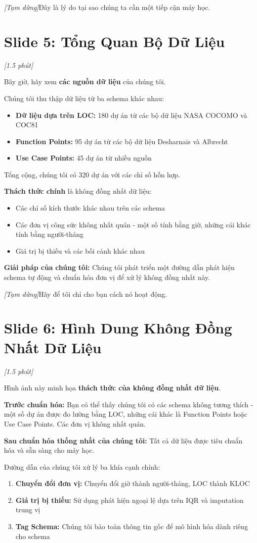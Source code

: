 \documentclass[12pt,a4paper]{article}
\newcommand{\slide}[1]{\section*{\textcolor{slidenum}{Slide #1}}}
\newcommand{\timing}[1]{\textcolor{timing}{\textit{[#1]}}}
\newcommand{\keypoint}[1]{\textcolor{keypoint}{\textbf{#1}}}
\newcommand{\pause}{\textit{[Tạm dừng]}}
\begin{document}
\pause Đây là lý do tại sao chúng ta cần một tiếp cận máy học.

\slide{5: Tổng Quan Bộ Dữ Liệu}
\timing{1.5 phút}

Bây giờ, hãy xem \keypoint{các nguồn dữ liệu} của chúng tôi.

Chúng tôi thu thập dữ liệu từ ba schema khác nhau:
\begin{itemize}
    \item \textbf{Dữ liệu dựa trên LOC:} 180 dự án từ các bộ dữ liệu NASA COCOMO và COC81
    \item \textbf{Function Points:} 95 dự án từ các bộ dữ liệu Desharnais và Albrecht
    \item \textbf{Use Case Points:} 45 dự án từ nhiều nguồn
\end{itemize}

Tổng cộng, chúng tôi có 320 dự án với các chỉ số hỗn hợp.

\textbf{Thách thức chính} là không đồng nhất dữ liệu:
\begin{itemize}
    \item Các chỉ số kích thước khác nhau trên các schema
    \item Các đơn vị công sức không nhất quán - một số tính bằng giờ, những cái khác tính bằng người-tháng
    \item Giá trị bị thiếu và các bối cảnh khác nhau
\end{itemize}

\textbf{Giải pháp của chúng tôi:} Chúng tôi phát triển một đường dẫn phát hiện schema tự động và chuẩn hóa đơn vị để xử lý không đồng nhất này.

\pause Hãy để tôi chỉ cho bạn cách nó hoạt động.

\slide{6: Hình Dung Không Đồng Nhất Dữ Liệu}
\timing{1.5 phút}

Hình ảnh này minh họa \keypoint{thách thức của không đồng nhất dữ liệu}.

\textbf{Trước chuẩn hóa:} Bạn có thể thấy chúng tôi có các schema không tương thích - một số dự án được đo lường bằng LOC, những cái khác là Function Points hoặc Use Case Points. Các đơn vị không nhất quán.

\textbf{Sau chuẩn hóa thống nhất của chúng tôi:} Tất cả dữ liệu được tiêu chuẩn hóa và sẵn sàng cho máy học.

Đường dẫn của chúng tôi xử lý ba khía cạnh chính:
\begin{enumerate}
    \item \textbf{Chuyển đổi đơn vị:} Chuyển đổi giờ thành người-tháng, LOC thành KLOC
    \item \textbf{Giá trị bị thiếu:} Sử dụng phát hiện ngoại lệ dựa trên IQR và imputation trung vị
    \item \textbf{Tag Schema:} Chúng tôi bảo toàn thông tin gốc để mô hình hóa dành riêng cho schema
\end{enumerate}
\end{document}
